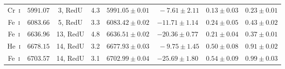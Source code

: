 \documentclass{aa}
\newcommand{\Hei}{He~\textsc{i}\xspace}
\begin{document}
\begin{appendix}
\begin{table}[ht]
\begin{tabular}[l]{c c c c c c c c}
Cr~\textsc{i} & $5991.07$ & \phantom{1}3, RedU & 4.3 & $5991.05\pm0.01$ & $\,\,-7.61\pm2.11$ & $0.13\pm0.03$ & $0.23\pm0.01$ \\
Fe~\textsc{i} & $6083.66$ & 5, RedU & 3.3 & $6083.42\pm0.02$ & $-11.71\pm1.14$ & $0.24\pm0.05$ & $0.43\pm0.02$ \\
Fe~\textsc{i} & $6636.96$ & 13, RedU & 4.8 & $6636.51\pm0.02$ & $-20.36\pm0.77$ & $0.21\pm0.04$ & $0.37\pm0.01$ \\
\Hei & $6678.15$ & 14, RedU & 3.2 & $6677.93\pm0.03$ & $\,\,-9.75\pm1.45$ & $0.50\pm0.08$ & $0.91\pm0.02$ \\
Fe~\textsc{i} & $6703.57$ & 14, RedU & 3.1 & $6702.99\pm0.04$ & $-25.69\pm1.80$ & $0.54\pm0.09$ & $0.99\pm0.03$ \\\hline
\end{tabular}
\label{aptab3}
\end{table}


\end{appendix}
\end{document}
